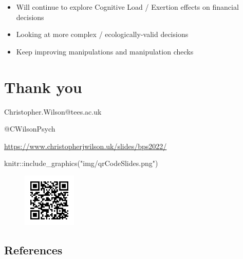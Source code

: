 \documentclass[
  letterpaper,
  DIV=11,
  numbers=noendperiod]{scrartcl}
\newenvironment{Shaded}{\begin{snugshade}}{\end{snugshade}}
\newcommand{\FunctionTok}[1]{\textcolor[rgb]{0.28,0.35,0.67}{#1}}
\newcommand{\NormalTok}[1]{\textcolor[rgb]{0.00,0.23,0.31}{#1}}
\newcommand{\SpecialCharTok}[1]{\textcolor[rgb]{0.37,0.37,0.37}{#1}}
\newcommand{\StringTok}[1]{\textcolor[rgb]{0.13,0.47,0.30}{#1}}
\begin{document}
\begin{itemize}
\item
  Will continue to explore Cognitive Load / Exertion effects on
  financial decisions
\item
  Looking at more complex / ecologically-valid decisions
\item
  Keep improving manipulations and manipulation checks
\end{itemize}

\hypertarget{thank-you}{%
\section{Thank you}\label{thank-you}}

Christopher.Wilson@tees.ac.uk

@CWilsonPsych

\url{https://www.christopherjwilson.uk/slides/bps2022/}

\begin{Shaded}
\begin{Highlighting}[]
\NormalTok{knitr}\SpecialCharTok{::}\FunctionTok{include\_graphics}\NormalTok{(}\StringTok{"img/qrCodeSlides.png"}\NormalTok{)}
\end{Highlighting}
\end{Shaded}

\begin{figure}[H]

{\centering \includegraphics[width=1in,height=\textheight]{img/qrCodeSlides.png}

}

\end{figure}

\hypertarget{references}{%
\subsection*{References}\label{references}}
\end{document}
